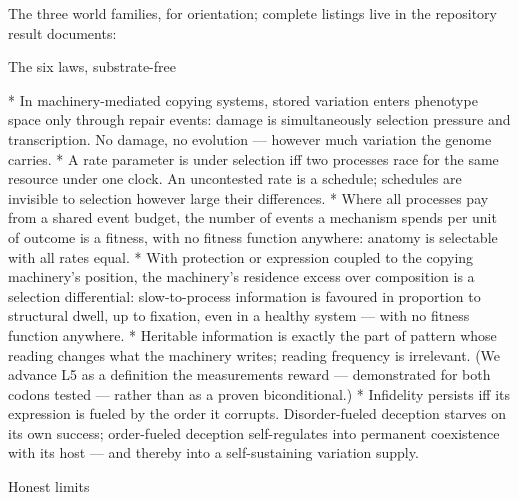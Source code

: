 \noindent The three world families, for orientation; complete
listings live in the repository result documents:

\medskip
\noindent{}
\medskip

\sec The six laws, substrate-free

\begitems
*  In machinery-mediated copying systems,
stored variation enters phenotype space only through repair
events: damage is simultaneously selection pressure and
transcription. No damage, no evolution --- however much variation
the genome carries.
*  A rate parameter is under selection iff two
processes race for the same resource under one clock. An
uncontested rate is a schedule; schedules are invisible to
selection however large their differences.
*  Where all processes pay from a
shared event budget, the number of events a mechanism spends per
unit of outcome is a fitness, with no fitness function anywhere:
anatomy is selectable with all rates equal.
*  With protection or expression coupled
to the copying machinery's position, the machinery's residence
excess over composition is a selection differential:
slow-to-process information is favoured in proportion to
structural dwell, up to fixation, even in a healthy system ---
with no fitness function anywhere.
*  Heritable information is exactly the
part of pattern whose reading changes what the machinery writes;
reading frequency is irrelevant. (We advance L5 as a definition
the measurements reward --- demonstrated for both codons tested
--- rather than as a proven biconditional.)
*  Infidelity persists iff its expression is
fueled by the order it corrupts. Disorder-fueled deception starves
on its own success; order-fueled deception self-regulates into
permanent coexistence with its host --- and thereby into a
self-sustaining variation supply.
\enditems

\sec Honest limits

